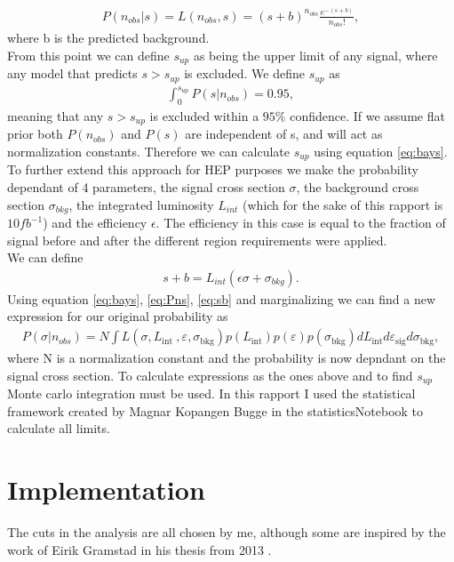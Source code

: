 \documentclass{article}
\begin{document}
\begin{align}\label{eq:Pns}
    P(n_{obs}|s) = L(n_{obs},s)= (s+b)^{n_{obs}} \frac{e^{-(s+b)}}{n_{obs}!},
\end{align}
where b is the predicted background. 
\\
From this point we can define $s_{up}$ as being the upper limit of any signal, where any model that predicts $s>s_{up}$ is excluded. We define $s_{up}$ as
\begin{align}
    \int_0^{s_{up}} P(s|n_{obs})  = 0.95,
\end{align}
meaning that any $s>s_{up}$ is excluded within a $95\%$ confidence. If we assume flat prior both $P(n_{obs})$ and $P(s)$ are independent of s, and will act as normalization constants. Therefore we can calculate $s_{up}$ using equation \ref{eq:bays}. 
\\
To further extend this approach for HEP purposes we make the probability dependant of 4 parameters, the signal cross section $\sigma$, the background cross section $\sigma_{bkg}$,  the integrated luminosity $L_{int}$ (which for the sake of this rapport is $10fb^{-1}$) and the efficiency $\epsilon$. The efficiency in this case is equal to the fraction of signal before and after the different region requirements were applied. 
\\
We can define 
\begin{align}\label{eq:sb}
    s+b = L_{int} (\epsilon \sigma + \sigma_{bkg}).
\end{align}
Using equation \ref{eq:bays}, \ref{eq:Pns}, \ref{eq:sb} and marginalizing we can find a new expression for our original probability as
\begin{align}
    P(\sigma | n_{obs}) =N \int L\left(\sigma, L_{\text {int }}, \varepsilon, \sigma_{\mathrm{bkg}}\right) p\left(L_{\mathrm{int}}\right) p\left(\varepsilon\right) p\left(\sigma_{\mathrm{bkg}}\right) d L_{\mathrm{int}} d \varepsilon_{\mathrm{sig}} d \sigma_{\mathrm{bkg}},
\end{align}
where N is a normalization constant and the probability is now depndant on the signal cross section. To calculate expressions as the ones above and to find $s_{up}$ Monte carlo integration must be used. In this rapport I used the statistical framework created by Magnar Kopangen Bugge in the statisticsNotebook to calculate all limits.
\section{Implementation}
The cuts in the analysis are all chosen by me, although some are inspired by the work of Eirik Gramstad in his thesis from 2013 \cite{Gramstad:2013loc}.
\end{document}
